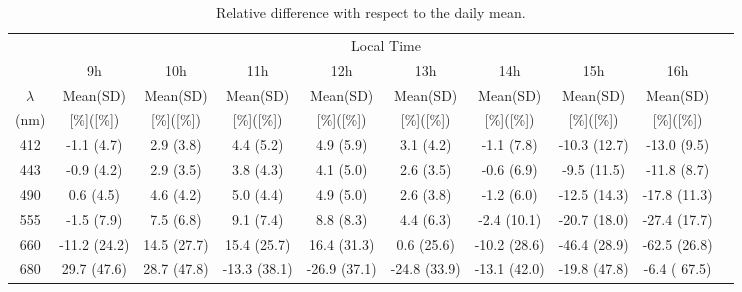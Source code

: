 \documentclass[onecolumn,3p,letterpaper,11pt]{elsarticle}
\begin{document}
\begin{table}[htbp!]
\caption{Relative difference with respect to the daily mean.\label{tab:rel_diff} } 
\scriptsize
\centering
\begin{tabular}{cccccccccc} \hline
      &   \multicolumn{8}{c}{Local Time}   \\ \cline{2-9}
   &    9h    & 10h  &  11h  &  12h  &  13h  &  14h  &  15h   &  16h   \\ 
$\lambda$     &    Mean(SD)    & Mean(SD)  &  Mean(SD)  &  Mean(SD)  &  Mean(SD)  &  Mean(SD)  &  Mean(SD)   &  Mean(SD)   \\ 
(nm)    &    [\%]([\%])    & [\%]([\%])  &  [\%]([\%])  &  [\%]([\%])  &  [\%]([\%])  &  [\%]([\%])  &  [\%]([\%])   &  [\%]([\%])   \\ \hline \hline
412 &  -1.1 (4.7)  & 2.9 (3.8)  &  4.4 (5.2)  &  4.9 (5.9)  &  3.1 (4.2) & -1.1 (7.8) & -10.3 (12.7) & -13.0 (9.5) \\
443 &  -0.9 (4.2) & 2.9 (3.5) &  3.8 (4.3) &  4.1 (5.0) &  2.6 (3.5) & -0.6 (6.9) &  -9.5 (11.5) & -11.8 (8.7)  \\
490 &   0.6 (4.5) & 4.6 (4.2) &  5.0 (4.4) &  4.9 (5.0) &  2.6 (3.8) & -1.2 (6.0) & -12.5 (14.3) & -17.8 (11.3) \\
555 &  -1.5 (7.9) & 7.5 (6.8) &  9.1 (7.4) &  8.8 (8.3) &  4.4 (6.3) & -2.4 (10.1) & -20.7 (18.0) & -27.4 (17.7) \\
660 & -11.2 (24.2) & 14.5 (27.7) &  15.4 (25.7) &  16.4 (31.3) &   0.6 (25.6) & -10.2 (28.6) &  -46.4 (28.9) &  -62.5 (26.8) \\
680 &  29.7 (47.6) & 28.7 (47.8) & -13.3 (38.1) & -26.9 (37.1) & -24.8 (33.9) & -13.1 (42.0) &  -19.8 (47.8) & -6.4 ( 67.5) \\ \hline
 \end{tabular}
\end{table}
\end{document}
